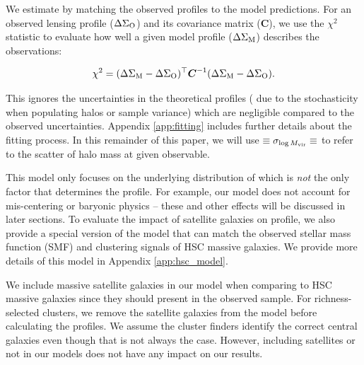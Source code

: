 \documentclass[fleqn,usenatbib,useAMS]{mnras}
\begin{document}
    We estimate \scatterMhaloObsSym{} by matching the observed \dsigma{} profiles to the model
    predictions. 
    For an observed lensing profile ($\Delta\Sigma_{\rm O}$) and its covariance matrix 
    ($\boldsymbol{C}$), we use the $\chi^2$ statistic to evaluate how well a given model profile 
    ($\Delta\Sigma_{\rm M}$) describes the observations:

    \begin{equation}
        \chi^{2}=(\Delta\Sigma_{\rm M}-\Delta\Sigma_{\rm O})^{\top}
                \boldsymbol{C}^{-1}(\Delta\Sigma_{\rm M}-\Delta\Sigma_{\rm O}).
        \label{eq:chi2}
    \end{equation}

    \noindent
    This ignores the uncertainties in the theoretical \dsigma{} profiles (\eg{} due to the
    stochasticity when populating halos or sample variance) which are negligible compared to the
    observed uncertainties. 
    Appendix \ref{app:fitting} includes further details about the fitting process.
    In this remainder of this paper, we will use \sigmvir{}$\equiv \sigma_{\log M_{\rm vir}} \equiv
    $\scatterMhaloObsSym{} to refer to the scatter of halo mass at given observable.

    This model only focuses on the underlying distribution of \mvir{} which is {\em not} the only 
    factor that determines the \dsigma{} profile. 
    For example, our model does not account for mis-centering or baryonic physics -- these and other
    effects will be discussed in later sections.
    To evaluate the impact of satellite galaxies on \dsigma{} profile, we also provide a special 
    version of the model that can match the observed stellar mass function (SMF) and clustering 
    signals of HSC massive galaxies. 
    We provide more details of this model in Appendix \ref{app:hsc_model}.

    We include massive satellite galaxies in our model when comparing to HSC massive galaxies since
    they should present in the observed sample.
    For richness-selected clusters, we remove the satellite galaxies from the model before
    calculating the \dsigma{} profiles.
    We assume the cluster finders identify the correct central galaxies even though that is not 
    always the case. 
    However, including satellites or not in our models does not have any impact on our results. 
\end{document}
